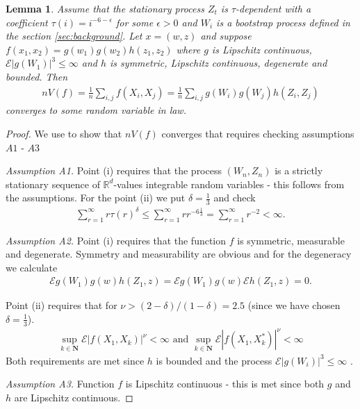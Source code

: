 \documentclass{article} %
\newtheorem{lemma}{Lemma}
\newcommand{\ev}{\mathcal{E}}
\begin{document}
\begin{lemma}
\label{lem:convergence2012}
Assume that the stationary process $Z_t$ is $\tau$-dependent with a coefficient $\tau(i) = i^{-6-\epsilon}$ for some $\epsilon>0$ and $W_i$ is a bootstrap process defined in the section \ref{sec:background}. Let $x=(w,z)$ and suppose $f(x_1,x_2) = g(w_1)g(w_2) h(z_1,z_2)$ where $g$ is Lipschitz continuous, $\ev |g(W_1)|^3 \leq \infty$ and $h$ is symmetric, Lipschitz continuous, degenerate and bounded. Then 
\begin{align}
n V(f)= \frac 1 n \sum_{i,j} f(X_i,X_j) = \frac 1 n \sum_{i,j} g(W_i) g(W_j) h(Z_i,Z_j) 
\end{align}
converges to some random variable in law.   
\end{lemma}
\begin{proof}
We use  \cite[Theorem 2.1]{leucht2012degenerate} to show that $n V(f)$ converges that requires checking assumptions $\textit{A1 - A3}$ 

\textit{Assumption A1.} Point (i) requires that the process $(W_n,Z_n)$ is a strictly stationary sequence of $\mathbb{R}^d$-values integrable random variables - this follows from the assumptions. For the point (ii) we put $\delta=\frac 1 3$ and check
\begin{align}
\sum_{r=1}^{\infty} r \tau(r)^{\delta} \leq \sum_{r=1}^{\infty} r r^{-6 \frac 1 3} = \sum_{r=1}^{\infty} r^{-2} < \infty. 
\end{align}

\textit{Assumption A2.} Point (i) requires that the function $f$ is symmetric, measurable and
degenerate. Symmetry and measurability are obvious and for the degeneracy we calculate 
\begin{align}
\ev g(W_1) g(w) h(Z_1,z) =  \ev g(W_1) g(w) \ev h(Z_1,z) = 0.
\end{align}  

 Point (ii) requires that for $\nu > (2-\delta)/(1-\delta) = 2.5$ (since we have chosen $\delta=\frac 1 3$).
\begin{align}
\sup_{k \in \mathbf{N}} \ev |f(X_1,X_k)|^{\nu} < \infty \text{ and } \sup_{k \in \mathbf{N}} \ev |f(X_1,X_k^*)|^{\nu} < \infty
\end{align}
Both requirements are met since $h$ is bounded and the process $\ev |g(W_i)|^3 \leq \infty$ .

\textit{Assumption A3.} Function $f$ is Lipschitz continuous - this is met since both $g$ and $h$ are Lipschitz continuous.   
\end{proof}
\end{document}
